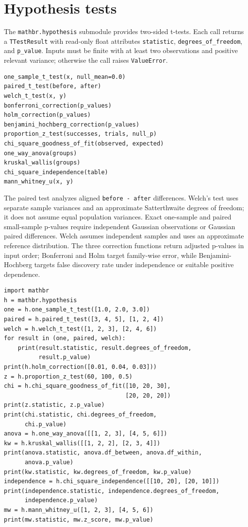 \documentclass[11pt,a4paper]{article}
\begin{document}
\section{Hypothesis tests}
The \verb|mathbr.hypothesis| submodule provides two-sided t-tests. Each call returns a \verb|TTestResult| with read-only float attributes \verb|statistic|, \verb|degrees_of_freedom|, and \verb|p_value|. Inputs must be finite with at least two observations and positive relevant variance; otherwise the call raises \verb|ValueError|.
\begin{verbatim}
one_sample_t_test(x, null_mean=0.0)
paired_t_test(before, after)
welch_t_test(x, y)
bonferroni_correction(p_values)
holm_correction(p_values)
benjamini_hochberg_correction(p_values)
proportion_z_test(successes, trials, null_p)
chi_square_goodness_of_fit(observed, expected)
one_way_anova(groups)
kruskal_wallis(groups)
chi_square_independence(table)
mann_whitney_u(x, y)
\end{verbatim}
The paired test analyzes aligned \verb|before - after| differences. Welch's test uses separate sample variances and an approximate Satterthwaite degrees of freedom; it does not assume equal population variances. Exact one-sample and paired small-sample p-values require independent Gaussian observations or Gaussian paired differences. Welch assumes independent samples and uses an approximate reference distribution. The three correction functions return adjusted p-values in input order; Bonferroni and Holm target family-wise error, while Benjamini-Hochberg targets false discovery rate under independence or suitable positive dependence.
\begin{verbatim}
import mathbr
h = mathbr.hypothesis
one = h.one_sample_t_test([1.0, 2.0, 3.0])
paired = h.paired_t_test([3, 4, 5], [1, 2, 4])
welch = h.welch_t_test([1, 2, 3], [2, 4, 6])
for result in (one, paired, welch):
    print(result.statistic, result.degrees_of_freedom,
          result.p_value)
print(h.holm_correction([0.01, 0.04, 0.03]))
z = h.proportion_z_test(60, 100, 0.5)
chi = h.chi_square_goodness_of_fit([10, 20, 30],
                                   [20, 20, 20])
print(z.statistic, z.p_value)
print(chi.statistic, chi.degrees_of_freedom,
      chi.p_value)
anova = h.one_way_anova([[1, 2, 3], [4, 5, 6]])
kw = h.kruskal_wallis([[1, 2, 2], [2, 3, 4]])
print(anova.statistic, anova.df_between, anova.df_within,
      anova.p_value)
print(kw.statistic, kw.degrees_of_freedom, kw.p_value)
independence = h.chi_square_independence([[10, 20], [20, 10]])
print(independence.statistic, independence.degrees_of_freedom,
      independence.p_value)
mw = h.mann_whitney_u([1, 2, 3], [4, 5, 6])
print(mw.statistic, mw.z_score, mw.p_value)
\end{verbatim}
\end{document}
